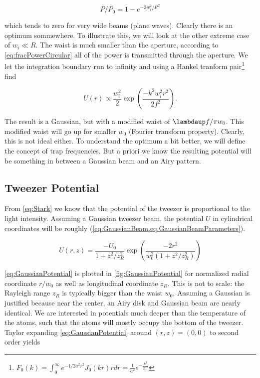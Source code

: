 \begin{equation}\label{eq:fracPowerCircular}
    P/P_0 = 1 - e^{-2w_i^2/R^2}
\end{equation}

which tends to zero for very wide beams (plane waves). Clearly there is an optimum sommewhere.
To illustrate this, we will look at the other extreme case of $w_i \ll R$. 
The waist is much smaller than the aperture, according to \cref{eq:fracPowerCircular} all of the power is transmitted through the aperture.
We let the integration boundary run to infinity and using a Hankel tranform pair\footnote{$F_0(k) = \int_0^{\infty} e^{-1/2 a^2 r^2} J_0(k r)r dr = \frac{1}{a^2} e^{-\frac{k^2}{2a^2}}$} find 

\begin{equation}\label{eq:GaussianCase}
    U(r) \propto \frac{w_i^2}{2} \exp{\left(\frac{-k^2w_i^2 r^2}{2f^2}\right)}.
\end{equation}

The result is a Gaussian, but with a modified waist of $\lambdaup f / \pi w_0$.
This modified waist will go up for smaller $w_0$ (Fourier transform property). 
Clearly, this is not ideal either. 
To understand the optimum a bit better, we will define the concept of trap frequencies. 
But a priori we know the resulting potential will be something in between a Gaussian beam and an Airy pattern. 

\subsection{Tweezer Potential}

From \cref{eq:Stark} we know that the potential of the tweezer is proportional to the light intensity. 
Assuming a Gaussian tweezer beam, the potential $U$ in cylindrical coordinates will be roughly (\cref{eq:GaussianBeam,eq:GaussianBeamParameters}).

\begin{equation}\label{eq:GaussianPotential}
    U(r,z)=\frac{-U_{0}}{1+z^{2} / z_{R}^{2}} \exp \left(\frac{-2 r^{2}}{w_{0}^{2}\left(1+z^{2} / z_{R}^{2}\right)}\right)
\end{equation}

\cref{eq:GaussianPotential} is plotted in \cref{fig:GaussianPotential} for normalized radial coordinate $r/w_0$ as well as longitudinal coordinate $z_R$. 
This is not to scale: the Rayleigh range $z_R$ is typically bigger than the waist $w_0$.
Assuming a Gaussian is justified because near the center, an Airy disk and Gaussian beam are nearly identical.
We are interested in potentials much deeper than the temperature of the atoms, such that the atoms will mostly occupy the bottom of the tweezer. 
Taylor expanding \cref{eq:GaussianPotential} around $(r,z)=(0,0)$ to second order yields 

